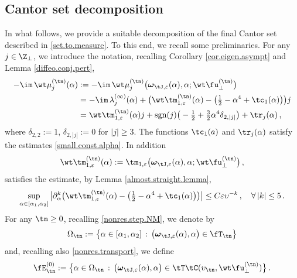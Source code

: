 \documentclass[a4paper,reqno,10pt]{article}
\newcommand{\pa}{\partial}
\newcommand{\bomega}{{\boldsymbol{\omega}}}
\begin{document}
\subsection{Cantor set decomposition}
In what follows, we provide a suitable decomposition of the final Cantor set described in \eqref{set.to.measure}. To this end, we recall some preliminaries. For any \( j \in \Z_{\perp} \), we introduce the notation, recalling Corollary \ref{cor.eigen.asympt} and Lemma \ref{diffeo.conj.pert},
    \begin{align}
			-\im \, \wt\mu_{j}^{(\tn)}(\alpha)&:= -\im\,\wt\mu_{j}^{(\tn)}\big(\bomega_{\tJ,\varepsilon}(\alpha),\alpha; \wt\fu_{\perp}^{(\tn)}\big)\\
			& = {- \im\,  \lambda_{j}^{(\infty)}(\alpha)  + \big(  \wt\tm_{1,\varepsilon}^{(\tn)}(\alpha)}-\big( \tfrac12 - \alpha^4 + \tc_{1}(\alpha) \big) \big)j \\
			& =   \wt\tm_{1,\varepsilon}^{(\tn)}(\alpha)j +{\rm sgn}(j)\big(- \tfrac12  + \tfrac32 \alpha^4 \delta_{2,|j|} \big)+ \tr_{j}(\alpha) \,, \label{ME.1.1}
		\end{align}
    where $\delta_{2, 2}:= 1$, $\delta_{2,|j|}:=0$ for $|j|\geq 3$. The functions   $\tc_{1}(a)$ and $\tr_{j}(\alpha)$ satisfy the estimates \eqref{small.const.alpha}. In addition
\begin{equation}
    \wt\tm_{1,\varepsilon}^{(\tn)}(\alpha) := \tm_{1,\varepsilon}\big(\bomega_{\tJ,\varepsilon}(\alpha),\alpha; \wt\fu_{\perp}^{(\tn)}\big) \,,
\end{equation}
 satisfies the estimate, by Lemma \ref{almost.straight.lemma},
\begin{equation}\label{diff-Hm}
 \sup_{\alpha\in[\alpha_{1},\alpha_{2}]}\big|\pa_{\alpha}^{k} \big(\wt\tm_{1,\varepsilon}^{(\tn)}(\alpha) -\big(\tfrac12 - \alpha^4 + \tc_{1}(\alpha) \big) \big)\big| \leq C \varepsilon \upsilon^{-k} \,,  \quad \forall\, |k|\leq 5 \,.   
\end{equation}
For any $\tn \geq 0$, recalling  \eqref{nonres.step.NM}, we denote by
\begin{equation}\label{set.n.to.measure}
     \Omega_{\tn} := \big\{  \alpha\in[\alpha_{1},\alpha_{2}] \, : \, \big( \bomega_{\tJ,\varepsilon}(\alpha),\alpha \big) \in \fT_{\tn} \big\} 
\end{equation}
and, recalling also \eqref{nonres.transport}, we define
\begin{equation}
    \fE_{\tn}^{(0)}  := \big\{  \alpha\in \Omega_{\tn} \, : \, \big( \bomega_{\tJ,\varepsilon}(\alpha),\alpha \big) \in \tT\tC (\upsilon_{\tn},\wt\fu_{\perp}^{(\tn)})  \big\} \,.
\end{equation}
\end{document}
